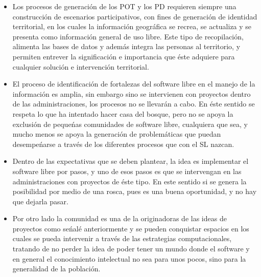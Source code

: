 \begin{multicols}{2}
\begin{itemize}
 \item Los procesos de generación de los POT y los PD requieren siempre una construcción de escenarios participativos, con fines de generación de identidad territorial, en los cuales la información geográfica se recrea, se actualiza y se presenta como información general de uso libre. Este tipo de recopilación, alimenta las bases de datos y además integra las personas al territorio, y permiten entrever la significación e importancia que éste adquiere para cualquier solución e intervención territorial.
 \item El proceso de identificación de fortalezas del software libre en el manejo de la información es amplia, sin embargo sino se intervienen con proyectos dentro de las administraciones, los procesos no se llevarán a cabo. En éste sentido se respeta lo que ha intentado hacer casa del bosque, pero no se apoya la exclusión de pequeńas comunidades de software libre, cualquiera que sea, y mucho menos se apoya la generación de problemáticas que puedan desempeńarse a través de los diferentes procesos que con el SL nazcan.
 \item Dentro de las expectativas que se deben plantear, la idea es implementar el software libre por pasos,  y uno de esos pasos es que se intervengan en las administraciones con proyectos de éste tipo. En este sentido si se genera la posibilidad por medio de una rosca, pues es una buena oportunidad, y no hay que dejarla pasar.
 \item Por otro lado la comunidad es una de la originadoras de las ideas de proyectos como seńalé anteriormente y se pueden conquistar espacios en los cuales se pueda intervenir a través de las estrategias computacionales, tratando de no perder la idea de poder tener un mundo donde el software y  en general el conocimiento intelectual no sea para unos pocos, sino para la generalidad de la población.
\end{itemize}




\end{multicols}
